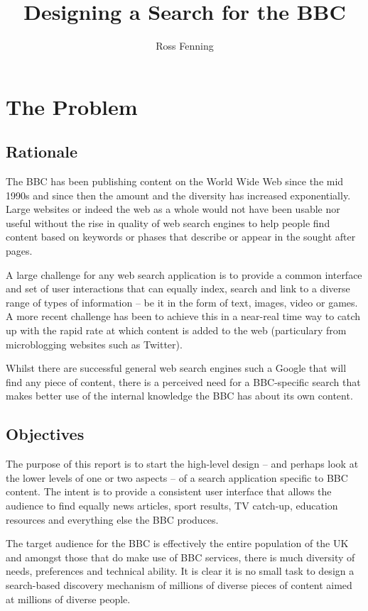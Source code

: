 \documentclass[a4paper]{report}
\title{Designing a Search for the BBC}
\author{Ross Fenning}
\begin{document}
\maketitle

\tableofcontents

\chapter{The Problem}

\section{Rationale}

The BBC has been publishing content on the World Wide Web since the
mid 1990s and since then the amount and the diversity has increased
exponentially. Large websites or indeed the web as a whole would not have
been usable nor useful without the rise in quality of web search engines to
help people find content based on keywords or phases that describe or
appear in the sought after pages.

A large challenge for any web search application is to provide a common
interface and set of user interactions that can equally index, search
and link to a diverse range of types of information -- be it in the form
of text, images, video or games. A more recent challenge has been to
achieve this in a near-real time way to catch up with the rapid rate at
which content is added to the web (particulary from microblogging websites
such as Twitter).

Whilst there are successful general web search engines such a Google that
will find any piece of content, there is a perceived need for a
BBC-specific search that makes better use of the internal knowledge the BBC
has about its own content.

\section{Objectives}

The purpose of this report is to start the high-level design -- and perhaps
look at the lower levels of one or two aspects -- of a search application
specific to BBC content. The intent is to provide a consistent user interface
that allows the audience to find equally news articles, sport results,
TV catch-up, education resources and everything else the BBC produces.

The target audience for the BBC is effectively the entire population of the UK
and amongst those that do make use of BBC services, there is much diversity
of needs, preferences and technical ability. It is clear it is no small
task to design a search-based discovery mechanism of millions of diverse
pieces of content aimed at millions of diverse people.
\end{document}
